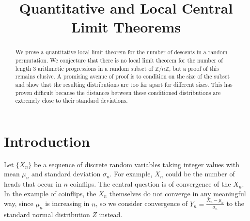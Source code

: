 \documentclass[12pt]{article} %
\title{Quantitative and Local Central Limit Theorems}
\author{}
\date{}
\newcommand{\f}[2]{\frac{#1}{#2}}
\newcommand{\Z}{\mathbb{Z}}
\theoremstyle{definition}
\theoremstyle{remark}
\begin{document}
\maketitle

\begin{abstract}
We prove a quantitative local limit theorem for the number of descents in a random permutation. We conjecture that there is no local limit theorem for the number of length 3 arithmetic progressions in a random subset of $\Z/n\Z$, but a proof of this remains elusive. A promising avenue of proof is to condition on the size of the subset and show that the resulting distributions are too far apart for different sizes. This has proven difficult because the distances between these conditioned distributions are extremely close to their standard deviations.
\end{abstract}

\section{Introduction}

Let $\{X_n\}$ be a sequence of discrete random variables taking integer values with mean $\mu_n$ and standard deviation $\sigma_n$. For example, $X_n$ could be the number of heads that occur in $n$ coinflips. The central question is of convergence of the $X_n$. In the example of coinflips, the $X_n$ themselves do not converge in any meaningful way, since $\mu_n$ is increasing in $n$, so we consider convergence of $Y_n = \f{X_n - \mu_n}{\sigma_n}$ to the standard normal distribution $Z$ instead.
\end{document}
